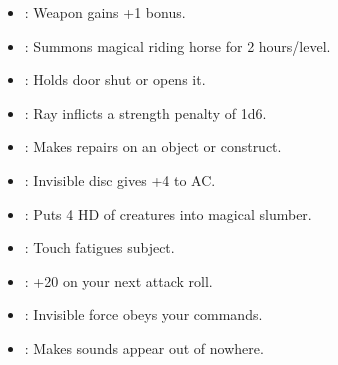 \begin{itemize}
\item {}: Weapon gains +1 bonus.
\item {}: Summons magical riding horse for 2 hours/level.
\item {}: Holds door shut or opens it.
\item {}: Ray inflicts a strength penalty of 1d6.
\item {}: Makes repairs on an object or construct.
\item {}: Invisible disc gives +4 to AC.
\item {}: Puts 4 HD of creatures into magical slumber.
\item {}: Touch fatigues subject.
\item {}: +20 on your next attack roll.
\item {}: Invisible force obeys your commands.
\item {}: Makes sounds appear out of nowhere.
\end{itemize}
